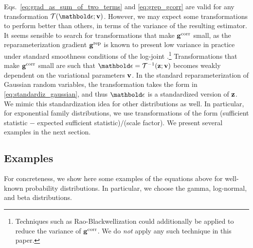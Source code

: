 Eqs.~\ref{eq:grad_as_sum_of_two_terms} and \ref{eq:grep_gcorr} are valid for any transformation $\Tcal(\beps;\bv)$. However, we may expect some transformations to perform better than others, in terms of the variance of the resulting estimator. It seems sensible to search for transformations that make $\mathbf{g}^{\textrm{corr}}$ small, as the reparameterization gradient $\mathbf{g}^{\textrm{rep}}$ is known to present low variance in practice under standard smoothness conditions of the log-joint \citep{Fan2015}.\footnote{Techniques such as Rao-Blackwellization could additionally be applied to reduce the variance of $\mathbf{g}^{\textrm{corr}}$. We do \emph{not} apply any such technique in this paper.} Transformations that make $\mathbf{g}^{\textrm{corr}}$ small are such that $\beps = \Tcal^{-1}(\bz;\bv)$ becomes weakly dependent on the variational parameters $\mathbf{v}$.
%
In the standard reparameterization of Gaussian random variables, the transformation takes the form in \eqref{eq:standardiz_gaussian}, and thus $\beps$ is a standardized version of $\mathbf{z}$. We mimic this standardization idea for other distributions as well. In particular, for exponential family distributions, we use transformations of the form (sufficient statistic $-$ expected sufficient statistic)$/$(scale factor). We present several examples in the next section.

\vspace*{-5pt}
\subsection{Examples}
\vspace*{-5pt}
For concreteness, we show here some examples of the equations above for well-known probability distributions. In particular, we choose the gamma, log-normal, and beta distributions.

